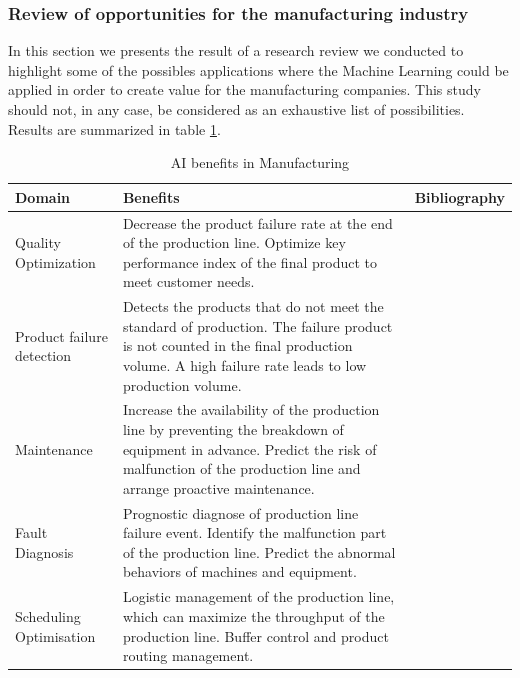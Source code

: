 \subsubsection{Review of opportunities for the manufacturing industry}

In this section we presents the result of a research review we conducted to highlight some of the possibles applications where the Machine Learning could be applied in order to create value for the manufacturing companies. This study should not, in any case, be considered as an exhaustive list of possibilities. Results are summarized in table \ref{tab:ai_benefits}. 

\begin{table}
\caption{AI benefits in Manufacturing}
\label{tab:ai_benefits}
\begin{tabular}{|l|p{6cm}|p{4cm}|}
\hline
%
Domain &
  Benefits &
    Bibliography \\ \hline
Quality Optimization &
  Decrease the product failure rate at the end of the production line. Optimize key performance index of the final product to meet customer needs. &
    \citep{lieber2013quality}\citep{li2018ensemble}\citep{chen2008neural}\citep{nagorny2017quality}\citep{haeussler1996quality} \\ \hline
Product failure detection &
  Detects the products that do not meet the standard of production. The failure product is not counted in the final production volume. A high failure rate leads to low production volume. &
    
    \\ \hline
Maintenance &
  Increase the availability of the production line by preventing the breakdown of equipment in advance. Predict the risk of malfunction of the production line and arrange proactive maintenance. &
    \citep{nguyen2019new}\citep{lee2017application}\citep{einabadi2019dynamic}\citep{li2017intelligent}\citep{liu2016prediction}\\ \hline
Fault Diagnosis &
  Prognostic diagnose of production line failure event. Identify the malfunction part of the production line. Predict the abnormal behaviors of machines and equipment. \\ \hline
Scheduling Optimisation &
  Logistic management of the production line, which can maximize the throughput of the production line. Buffer control and product routing management. \\ \hline
\end{tabular}
\end{table}

